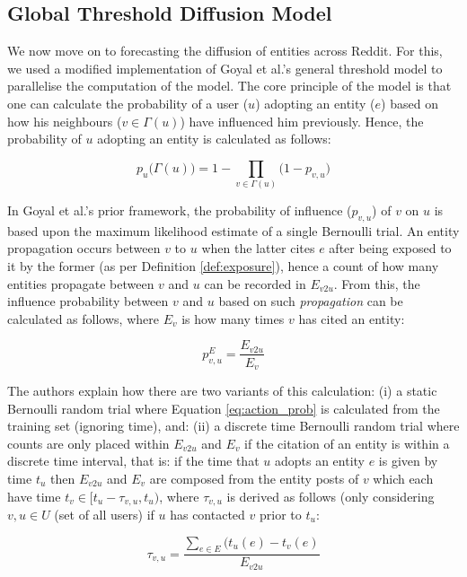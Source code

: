 \documentclass[review]{elsarticle}
\begin{document}
\subsection{Global Threshold Diffusion Model}
We now move on to forecasting the diffusion of entities across Reddit.
For this, we used a modified implementation of Goyal et al.'s general threshold model \cite{goyal2010learning} to parallelise the computation of the model.
The core principle of the model is that one can calculate the probability of a user ($u$) adopting an entity ($e$) based on how his neighbours ($v \in \Gamma(u)$) have influenced him previously.
Hence, the probability of $u$ adopting an entity is calculated as follows:

\begin{equation}
\label{eq:joint_prob}
p_u\big(\Gamma(u)\big) = 1 - \displaystyle\prod_{v \in \Gamma(u)}\big(1 - p_{v,u}\big)
\end{equation}

In Goyal et al.'s prior framework, the probability of influence ($p_{v,u}$) of $v$ on $u$ is based upon the maximum likelihood estimate of a single Bernoulli trial.
An entity propagation occurs between $v$ to $u$ when the latter cites $e$ after being exposed to it by the former (as per Definition \ref{def:exposure}), hence a count of how many entities propagate between $v$ and $u$ can be recorded in $E_{v2u}$.
From this, the influence probability between $v$ and $u$ based on such \emph{propagation} can be calculated as follows, where $E_v$ is how many times $v$ has cited an entity:

\begin{equation}
\label{eq:action_prob}
p^{E}_{v,u} = \frac{E_{v2u}}{E_v}
\end{equation}

The authors explain how there are two variants of this calculation: (i) a static Bernoulli random trial where Equation \ref{eq:action_prob} is calculated from the training set (ignoring time), and: (ii) a discrete time Bernoulli random trial where counts are only placed within $E_{v2u}$ and $E_v$ if the citation of an entity is within a discrete time interval, that is: if the time that $u$ adopts an entity $e$ is given by time $t_u$ then $E_{v2u}$ and $E_v$ are composed from the entity posts of $v$ which each have time $t_v \in [t_u - \tau_{v,u}, t_u)$, where $\tau_{v,u}$ is derived as follows (only considering $v, u \in U$ (set of all users) if $u$ has contacted $v$ prior to $t_u$:

\begin{equation}
\tau_{v,u} = \frac{\displaystyle\sum_{e \in E} (t_u(e) - t_v(e)}{E_{v2u}}
\end{equation}
\end{document}
